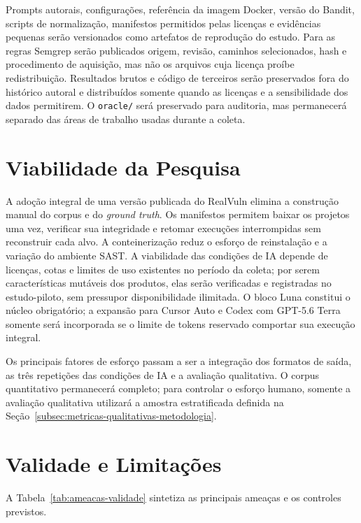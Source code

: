 Prompts autorais, configurações, referência da imagem Docker, versão do Bandit, scripts de normalização, manifestos permitidos pelas licenças e evidências pequenas serão versionados como artefatos de reprodução do estudo. Para as regras Semgrep serão publicados origem, revisão, caminhos selecionados, hash e procedimento de aquisição, mas não os arquivos cuja licença proíbe redistribuição. Resultados brutos e código de terceiros serão preservados fora do histórico autoral e distribuídos somente quando as licenças e a sensibilidade dos dados permitirem. O \texttt{oracle/} será preservado para auditoria, mas permanecerá separado das áreas de trabalho usadas durante a coleta.

\section{Viabilidade da Pesquisa}\label{sec:viabilidade-pesquisa}

A adoção integral de uma versão publicada do RealVuln elimina a construção manual do corpus e do \textit{ground truth}. Os manifestos permitem baixar os projetos uma vez, verificar sua integridade e retomar execuções interrompidas sem reconstruir cada alvo. A conteinerização reduz o esforço de reinstalação e a variação do ambiente SAST. A viabilidade das condições de IA depende de licenças, cotas e limites de uso existentes no período da coleta; por serem características mutáveis dos produtos, elas serão verificadas e registradas no estudo-piloto, sem pressupor disponibilidade ilimitada. O bloco Luna constitui o núcleo obrigatório; a expansão para Cursor Auto e Codex com GPT-5.6 Terra somente será incorporada se o limite de tokens reservado comportar sua execução integral.

Os principais fatores de esforço passam a ser a integração dos formatos de saída, as três repetições das condições de IA e a avaliação qualitativa. O corpus quantitativo permanecerá completo; para controlar o esforço humano, somente a avaliação qualitativa utilizará a amostra estratificada definida na Seção~\ref{subsec:metricas-qualitativas-metodologia}.

\section{Validade e Limitações}\label{sec:validade-limitacoes}

A Tabela~\ref{tab:ameacas-validade} sintetiza as principais ameaças e os controles previstos.

